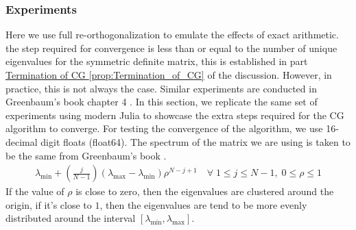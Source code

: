 \documentclass[]{article}
\theoremstyle{definition}
\begin{document}
        \subsubsection{Experiments}
        Here we use full re-orthogonalization to emulate the effects of exact arithmetic. the step required for convergence is less than or equal to the number of unique eigenvalues for the symmetric definite matrix, this is established in part \hyperref[prop:Termination_of_CG]{Termination of CG \ref*{prop:Termination_of_CG}} of the discussion. However, in practice, this is not always the case. Similar experiments are conducted in Greenbaum's book chapter 4 \cite{book:greenbaum}. In this section, we replicate the same set of experiments using modern Julia to showcase the extra steps required for the CG algorithm to converge. For testing the convergence of the algorithm, we use 16-decimal digit floats (float64). The spectrum of the matrix we are using is taken to be the same from Greenbaum's book \cite{book:greenbaum}. 
        \begin{align}
            \lambda_{\min} + \left(
                \frac{j}{N - 1}
            \right)(\lambda_{\max} - \lambda_{\min})\rho^{N - j + 1}\quad \forall\; 1 \le j \le N - 1, \; 0 \le \rho \le 1
        \end{align}
        If the value of $\rho$ is close to zero, then the eigenvalues are clustered around the origin, if it's close to $1$, then the eigenvalues are tend to be more evenly distributed around the interval $[\lambda_{\min}, \lambda_{\max}]$. 
\end{document}
